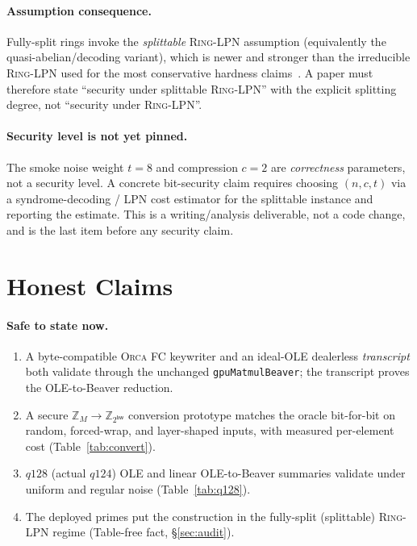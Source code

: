 \documentclass[11pt]{article}
\newcommand{\Z}{\mathbb{Z}}
\newcommand{\modtwo}{\Z_{2^{\mathsf{bw}}}}
\newcommand{\Orca}{\textsc{Orca}}
\newcommand{\RingLPN}{\textsc{Ring-LPN}}
\begin{document}
\paragraph{Assumption consequence.} Fully-split rings invoke the
\emph{splittable} \RingLPN{} assumption (equivalently the quasi-abelian/decoding
variant), which is newer and stronger than the irreducible \RingLPN{} used for
the most conservative hardness claims~\cite{boyle2022ringlpn,bombar2023qa}. A
paper must therefore state ``security under splittable \RingLPN{}'' with the
explicit splitting degree, not ``security under \RingLPN{}''.

\paragraph{Security level is not yet pinned.} The smoke noise weight $t=8$ and
compression $c=2$ are \emph{correctness} parameters, not a security level. A
concrete bit-security claim requires choosing $(n,c,t)$ via a syndrome-decoding /
LPN cost estimator for the splittable instance and reporting the estimate. This
is a writing/analysis deliverable, not a code change, and is the last item before
any security claim.

\section{Honest Claims}

\paragraph{Safe to state now.}
\begin{enumerate}[leftmargin=*]
  \item A byte-compatible \Orca{} FC keywriter and an ideal-OLE dealerless
  \emph{transcript} both validate through the unchanged
  \texttt{gpuMatmulBeaver}; the transcript proves the OLE-to-Beaver reduction.
  \item A secure $\Z_M\!\to\!\modtwo$ conversion prototype matches the oracle
  bit-for-bit on random, forced-wrap, and layer-shaped inputs, with measured
  per-element cost (Table~\ref{tab:convert}).
  \item $q128$ (actual $q124$) OLE and linear OLE-to-Beaver summaries validate
  under uniform and regular noise (Table~\ref{tab:q128}).
  \item The deployed primes put the construction in the fully-split (splittable)
  \RingLPN{} regime (Table-free fact, \S\ref{sec:audit}).
\end{enumerate}
\end{document}
